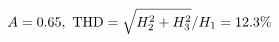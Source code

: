 \documentclass[preview]{standalone}
\begin{document}
\begin{align*}
\special{dvisvgm:raw <g id='unique000'>}A=0.65,\ \text{THD}=\sqrt{H_2^2+H_3^2}/H_1=12.3\%\special{dvisvgm:raw </g>}
\end{align*}
\end{document}
